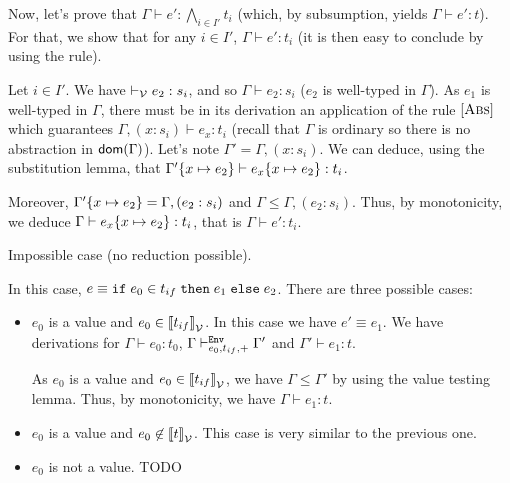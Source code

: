 \documentclass[a4paper]{article}
\theoremstyle{definition}
\begin{document}
\begin{description}
\begin{itemize}
            Now, let's prove that $\Gamma \vdash e':\bigwedge_{i\in I'} t_i$ (which, by subsumption,
            yields $\Gamma \vdash e': t$). For that, we show that for any $i\in I'$, $\Gamma \vdash e':t_i$
            (it is then easy to conclude by using the  rule).

            Let $i\in I'$. We have $\vvdash e_2:s_i$, and so $\Gamma \vdash e_2:s_i$ ($e_2$ is well-typed in $\Gamma$).
            As $e_1$ is well-typed in $\Gamma$, there must be in its derivation an application of the rule $\Rule{Abs}$
            which guarantees $\Gamma,(x:s_i) \vdash e_x:t_i$ (recall that $\Gamma$ is ordinary so there is no abstraction in $\dom\Gamma$).
            Let's note $\Gamma'=\Gamma,(x:s_i)$.
            We can deduce, using the substitution lemma, that $\Gamma'\subst x {e_2} \vdash e_x\subst x {e_2}: t_i$.
           
            Moreover, $\Gamma'\subst x {e_2} = \Gamma,(e_2:s_i)$ and $\Gamma \leq \Gamma,(e_2:s_i)$.
            Thus, by monotonicity, we deduce $\Gamma \vdash e_x\subst x {e_2}: t_i$,
            that is $\Gamma \vdash e': t_i$.
          \end{itemize}
          \item[\Rule{Abs}] Impossible case (no reduction possible).
          \item[\Rule{If}] In this case, $e\equiv \ite {e_0} {t_{if}} {e_1} {e_2}$. There are three possible cases:
          \begin{itemize}
            \item $e_0$ is a value and $e_0 \in \valsemantic{t_{if}}$. In this case we have $e' \equiv e_1$.
            We have derivations for $\Gamma \vdash e_0: t_0$, $\Gamma \evdash + {e_0} {t_{if}} \Gamma'$ and $\Gamma'\vdash e_1:t$.
            
            As $e_0$ is a value and $e_0 \in \valsemantic{t_{if}}$, we have $\Gamma\leq\Gamma'$ by using the value testing lemma.
            Thus, by monotonicity, we have $\Gamma\vdash e_1:t$.
            \item $e_0$ is a value and $e_0 \not\in \valsemantic{t}$. This case is very similar to the previous one.
            \item $e_0$ is not a value. TODO
          \end{itemize}
        \end{description}
\end{document}
